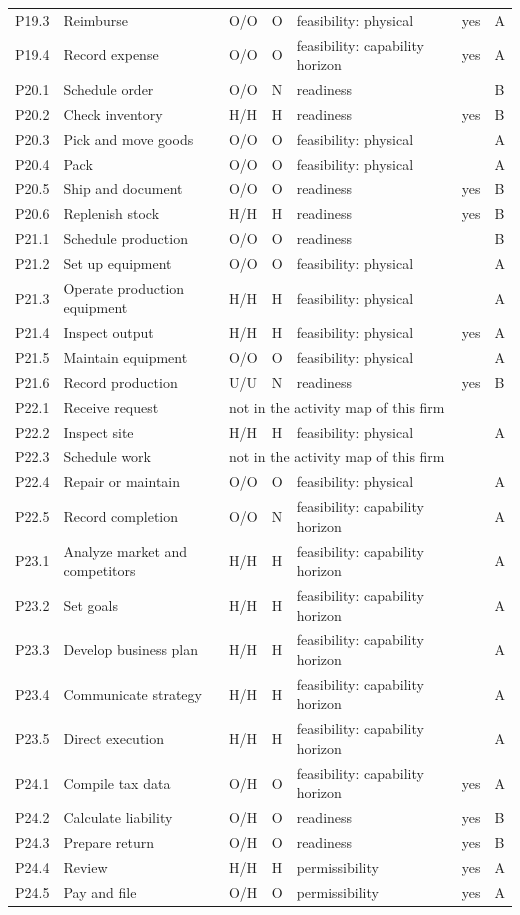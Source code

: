 \begin{longtable}{@{}lp{4.4cm}llp{4.2cm}rll@{}}
P19.3 & Reimburse & O/O & O & feasibility: physical &  & yes & A \\
P19.4 & Record expense & O/O & O & feasibility: capability horizon &  & yes & A \\
P20.1 & Schedule order & O/O & N & readiness &  &  & B \\
P20.2 & Check inventory & H/H & H & readiness &  & yes & B \\
P20.3 & Pick and move goods & O/O & O & feasibility: physical &  &  & A \\
P20.4 & Pack & O/O & O & feasibility: physical &  &  & A \\
P20.5 & Ship and document & O/O & O & readiness &  & yes & B \\
P20.6 & Replenish stock & H/H & H & readiness &  & yes & B \\
P21.1 & Schedule production & O/O & O & readiness &  &  & B \\
P21.2 & Set up equipment & O/O & O & feasibility: physical &  &  & A \\
P21.3 & Operate production equipment & H/H & H & feasibility: physical &  &  & A \\
P21.4 & Inspect output & H/H & H & feasibility: physical &  & yes & A \\
P21.5 & Maintain equipment & O/O & O & feasibility: physical &  &  & A \\
P21.6 & Record production & U/U & N & readiness &  & yes & B \\
P22.1 & Receive request & \multicolumn{6}{l}{not in the activity map of this firm} \\
P22.2 & Inspect site & H/H & H & feasibility: physical &  &  & A \\
P22.3 & Schedule work & \multicolumn{6}{l}{not in the activity map of this firm} \\
P22.4 & Repair or maintain & O/O & O & feasibility: physical &  &  & A \\
P22.5 & Record completion & O/O & N & feasibility: capability horizon &  &  & A \\
P23.1 & Analyze market and competitors & H/H & H & feasibility: capability horizon &  &  & A \\
P23.2 & Set goals & H/H & H & feasibility: capability horizon &  &  & A \\
P23.3 & Develop business plan & H/H & H & feasibility: capability horizon &  &  & A \\
P23.4 & Communicate strategy & H/H & H & feasibility: capability horizon &  &  & A \\
P23.5 & Direct execution & H/H & H & feasibility: capability horizon &  &  & A \\
P24.1 & Compile tax data & O/H & O & feasibility: capability horizon &  & yes & A \\
P24.2 & Calculate liability & O/H & O & readiness &  & yes & B \\
P24.3 & Prepare return & O/H & O & readiness &  & yes & B \\
P24.4 & Review & H/H & H & permissibility &  & yes & A \\
P24.5 & Pay and file & O/H & O & permissibility &  & yes & A \\
\end{longtable}
\endgroup
